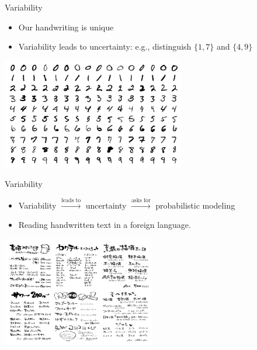 \documentclass{beamer}
\begin{document}
\begin{frame}{Variability}
\begin{itemize}
  \item Our handwriting is unique
  \item Variability leads to uncertainty: e.g., distinguish $\{1,7\}$ and $\{4,9\}$
\end{itemize}
\begin{center}
  \includegraphics[width=0.6\textwidth]{handwriting_example.png}
\end{center}
\end{frame}

\begin{frame}{Variability}
\begin{itemize}
\item Variability $\xrightarrow{\text{leads to}}$ uncertainty $\xrightarrow{\text{asks for}}$ probabilistic modeling
  \item Reading handwritten text in a foreign language.
\end{itemize}
\begin{center}
  \includegraphics[width=0.5\textwidth]{foreign_handwriting.png}
\end{center}
\end{frame}
\end{document}
